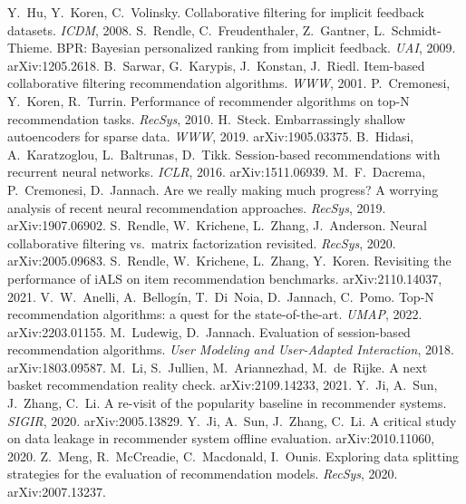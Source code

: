  Y.~Hu, Y.~Koren, C.~Volinsky. Collaborative filtering for implicit feedback datasets. \emph{ICDM}, 2008.
 S.~Rendle, C.~Freudenthaler, Z.~Gantner, L.~Schmidt-Thieme. BPR: Bayesian personalized ranking from implicit feedback. \emph{UAI}, 2009. arXiv:1205.2618.
 B.~Sarwar, G.~Karypis, J.~Konstan, J.~Riedl. Item-based collaborative filtering recommendation algorithms. \emph{WWW}, 2001.
 P.~Cremonesi, Y.~Koren, R.~Turrin. Performance of recommender algorithms on top-N recommendation tasks. \emph{RecSys}, 2010.
 H.~Steck. Embarrassingly shallow autoencoders for sparse data. \emph{WWW}, 2019. arXiv:1905.03375.
 B.~Hidasi, A.~Karatzoglou, L.~Baltrunas, D.~Tikk. Session-based recommendations with recurrent neural networks. \emph{ICLR}, 2016. arXiv:1511.06939.
 M.~F.~Dacrema, P.~Cremonesi, D.~Jannach. Are we really making much progress? A worrying analysis of recent neural recommendation approaches. \emph{RecSys}, 2019. arXiv:1907.06902.
 S.~Rendle, W.~Krichene, L.~Zhang, J.~Anderson. Neural collaborative filtering vs.\ matrix factorization revisited. \emph{RecSys}, 2020. arXiv:2005.09683.
 S.~Rendle, W.~Krichene, L.~Zhang, Y.~Koren. Revisiting the performance of iALS on item recommendation benchmarks. arXiv:2110.14037, 2021.
 V.~W.~Anelli, A.~Bellogín, T.~Di~Noia, D.~Jannach, C.~Pomo. Top-N recommendation algorithms: a quest for the state-of-the-art. \emph{UMAP}, 2022. arXiv:2203.01155.
 M.~Ludewig, D.~Jannach. Evaluation of session-based recommendation algorithms. \emph{User Modeling and User-Adapted Interaction}, 2018. arXiv:1803.09587.
 M.~Li, S.~Jullien, M.~Ariannezhad, M.~de~Rijke. A next basket recommendation reality check. arXiv:2109.14233, 2021.
 Y.~Ji, A.~Sun, J.~Zhang, C.~Li. A re-visit of the popularity baseline in recommender systems. \emph{SIGIR}, 2020. arXiv:2005.13829.
 Y.~Ji, A.~Sun, J.~Zhang, C.~Li. A critical study on data leakage in recommender system offline evaluation. arXiv:2010.11060, 2020.
 Z.~Meng, R.~McCreadie, C.~Macdonald, I.~Ounis. Exploring data splitting strategies for the evaluation of recommendation models. \emph{RecSys}, 2020. arXiv:2007.13237.
